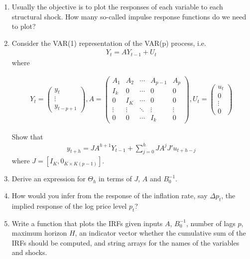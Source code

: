 \begin{enumerate}
\item Usually the objective is to plot the responses of each variable to each structural shock.
How many so-called impulse response functions do we need to plot?

\item Consider the VAR(1) representation of the VAR(p) process, i.e.\
\begin{align*}
Y_t = A Y_{t-1} + U_t
\end{align*}
where
\begin{footnotesize}
\begin{align*}
Y_t = \begin{pmatrix}
    y_t\\ \vdots\\ y_{t-p+1}
    \end{pmatrix}, 
    A = \begin{pmatrix}
    A_1 & A_2 & \cdots  & A_{p-1} & A_p\\
    I_k &   0 & \cdots  & 0       & 0\\
    0   &  I_K& \cdots  & 0       & 0\\
    \vdots & \vdots & \ddots &\vdots & \vdots\\ 
    0& 0 & \cdots  &I_k & 0
    \end{pmatrix},
    U_t = \begin{pmatrix} u_t\\0\\ \vdots \\0 \end{pmatrix}
\end{align*}
\end{footnotesize}
Show that
\begin{align*}
    y_{t+h} = J A^{h+1} Y_{t-1}+ \sum_{j=0}^h J A^j J' u_{t+h-j}
\end{align*}
where \(J=[I_K, 0_{K\times K(p-1)}]\).

\item Derive an expression for \(\Theta_h\) in terms of \(J\), \(A\) and \(B_0^{-1}\).

\item How would you infer from the response of the inflation rate, say \(\Delta p_t\), the implied response of the log price level \(p_t\)?
 	
\item Write a function that plots the IRFs given inputs \(A\), \(B_0^{-1}\), number of lags \(p\), maximum horizon \(H\),
  an indicator vector whether the cumulative sum of the IRFs should be computed, and string arrays for the names of the variables and shocks.
\end{enumerate}

